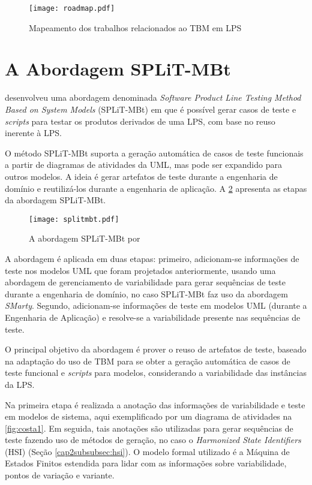 \begin{landscape}
	\begin{figure}[h!]
		\centering
		\texttt{[image: roadmap.pdf]}
		\caption{Mapeamento dos trabalhos relacionados ao TBM em LPS}
		\label{fig:roadmap}
	\end{figure}
\end{landscape}


\section{A Abordagem SPLiT-MBt}
\label{cap2sec:split_abordagem}

\citet{costa2016split} desenvolveu uma abordagem denominada \textit{Software Product Line Testing Method Based on System Models} (SPLiT-MBt) em que é possível gerar casos de teste e \textit{scripts} para testar os produtos derivados de uma LPS, com base no reuso inerente à LPS.

O método SPLiT-MBt suporta a geração automática de casos de teste funcionais a partir de diagramas de atividades da UML, mas pode ser expandido para outros modelos. A ideia é gerar artefatos de teste durante a engenharia de domínio e reutilizá-los durante a engenharia de aplicação. A \ref{fig:splitmbt} apresenta as etapas da abordagem SPLiT-MBt. 

\begin{figure}[h!]
	\centering
	\texttt{[image: splitmbt.pdf]}
	\caption{A abordagem SPLiT-MBt por \citet{costa2016split}}
	\label{fig:splitmbt}
\end{figure}

A abordagem é aplicada em duas etapas: primeiro, adicionam-se informações de teste nos modelos UML que foram projetados anteriormente, usando uma abordagem de gerenciamento de variabilidade para gerar sequências de teste durante a engenharia de domínio, no caso SPLiT-MBt faz uso da abordagem \textit{SMarty}. Segundo, adicionam-se informações de teste em modelos UML (durante a Engenharia de Aplicação) e resolve-se a variabilidade presente nas sequências de teste. 

O principal objetivo da abordagem é prover o reuso de artefatos de teste, baseado na adaptação do uso de TBM para se obter a geração automática de casos de teste funcional e \textit{scripts} para modelos, considerando a variabilidade das instâncias da LPS.

Na primeira etapa é realizada a anotação das informações de variabilidade e teste em modelos de sistema, aqui exemplificado por um diagrama de atividades na \ref{fig:costa1}. Em seguida, tais anotações são utilizadas para gerar sequências de teste fazendo uso de métodos de geração, no caso o \textit{Harmonized State Identifiers} (HSI) (Seção \ref{cap2subsubsec:hsi}). O modelo formal utilizado é a Máquina de Estados Finitos estendida para lidar com as informações sobre variabilidade, pontos de variação e variante.

